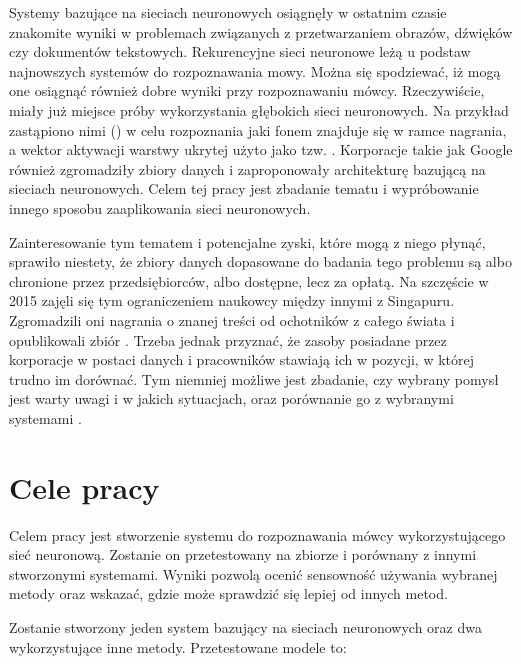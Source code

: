 Systemy bazujące na sieciach neuronowych osiągnęły w ostatnim czasie znakomite wyniki w problemach
związanych z przetwarzaniem obrazów, dźwięków czy dokumentów tekstowych. Rekurencyjne sieci neuronowe
leżą u podstaw najnowszych systemów do rozpoznawania mowy. Można się spodziewać, iż mogą one
osiągnąć również dobre wyniki przy rozpoznawaniu mówcy. Rzeczywiście, miały już miejsce próby
wykorzystania głębokich sieci neuronowych. Na przykład zastąpiono nimi
 () w celu rozpoznania
jaki fonem znajduje się w ramce nagrania, a wektor aktywacji warstwy ukrytej użyto jako tzw.
\cite{investigationOfBottleneck}.
Korporacje takie jak Google również zgromadziły zbiory danych i zaproponowały architekturę bazującą na sieciach
neuronowych\cite{endToEnd}. Celem tej pracy jest zbadanie tematu i wypróbowanie innego sposobu zaaplikowania
sieci neuronowych.

Zainteresowanie tym tematem i potencjalne zyski, które mogą z niego płynąć, sprawiło niestety,
że zbiory danych dopasowane do badania tego problemu są albo chronione przez przedsiębiorców,
albo dostępne, lecz za opłatą. Na szczęście w 2015 zajęli się tym ograniczeniem naukowcy
między innymi z Singapuru. Zgromadzili oni nagrania o znanej
treści od ochotników z całego świata i opublikowali zbiór . Trzeba jednak przyznać, że
zasoby posiadane przez korporacje w postaci danych i pracowników stawiają ich
w pozycji, w której trudno im dorównać. Tym niemniej możliwe jest zbadanie, czy wybrany pomysł
jest warty uwagi i w jakich sytuacjach, oraz porównanie go z wybranymi systemami .

\section{Cele pracy}\label{sec:cele_pracy}

Celem pracy jest stworzenie systemu do rozpoznawania mówcy wykorzystującego sieć neuronową.
Zostanie on przetestowany na zbiorze  i porównany z innymi stworzonymi systemami.
Wyniki pozwolą ocenić sensowność używania wybranej metody oraz wskazać, gdzie może sprawdzić się lepiej
od innych metod.

Zostanie stworzony jeden system bazujący na sieciach neuronowych oraz dwa wykorzystujące inne metody. Przetestowane
modele to:

